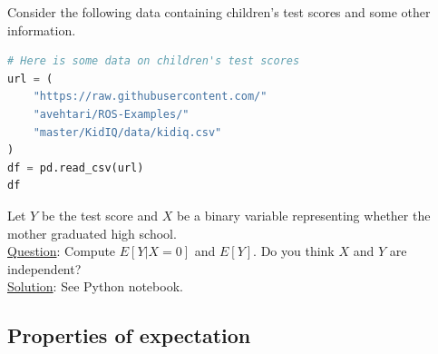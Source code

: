 \begin{example}
Consider the following data containing children's test scores and some other information. 
\begin{lstlisting}[language=Python]
# Here is some data on children's test scores
url = (
    "https://raw.githubusercontent.com/"
    "avehtari/ROS-Examples/"
    "master/KidIQ/data/kidiq.csv"
)
df = pd.read_csv(url)
df
\end{lstlisting}

Let $Y$ be the test score and $X$ be a binary variable representing whether the mother graduated high school.\\


\noindent
\underline{Question}: Compute $E[Y|X=0]$ and $E[Y]$. Do you think $X$ and $Y$ are independent? \\

\noindent
\underline{Solution}: See Python notebook.



\end{example}




  \subsection{Properties of expectation}\label{prop:lin} 
  
